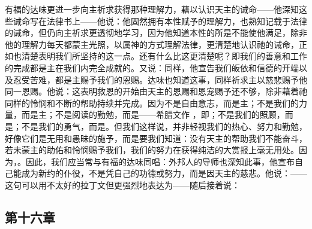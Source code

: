 有福的达味更进一步向主祈求获得那种理解力，藉以认识天主的诫命——他深知这些诫命写在法律书上——他说：他固然拥有本性赋予的理解力，也熟知记载于法律的诫命，但仍向主祈求更透彻地学习，因为他知道本性的所是不能使他满足，除非他的理解力每天都蒙主光照，以属神的方式理解法律，更清楚地认识祂的诫命，正如也清楚表明我们所坚持的这一点。还有什么比这更清楚呢？即我们的善意和工作的完成都是主在我们内完全成就的。又说：同样，他宣告我们皈依和信德的开端以及忍受苦难，都是主赐予我们的恩赐。达味也知道这事，同样祈求主以慈悲赐予他同一恩赐。他说：这表明救恩的开始由天主的恩赐和恩宠赐予还不够，除非藉着祂同样的怜悯和不断的帮助持续并完成。因为不是自由意志，而是主；不是我们的力量，而是主；不是阅读的勤勉，而是——希腊文作 ，即；不是我们的照顾，而是；不是我们的勇气，而是。但我们这样说，并非轻视我们的热心、努力和勤勉，好像它们是无用和愚昧的施予，而是要我们知道：没有天主的帮助我们不能奋斗，若未蒙主的助佑和怜悯赐予我们，我们的努力在获得纯洁的大赏报上毫无用处。因为，。因此，我们应当常与有福的达味同唱：外邦人的导师也深知此事，他宣布自己能成为新约的仆役，不是凭自己的功德或努力，而是因天主的慈悲。他说：——这句可以用不太好的拉丁文但更强烈地表达为——随后接着说：\par


\subsection{第十六章}

\par

